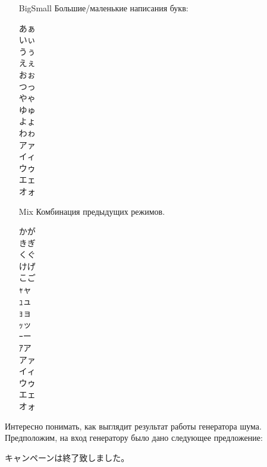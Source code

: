 \begin{itemize}
	\item[BigSmall] Большие/маленькие написания букв:
	
	\begin{multicols}{3}
	\begin{CJK}{UTF8}{min}
		あぁ \\
		いぃ\\
		うぅ\\
		えぇ\\
		おぉ\\
		つっ\\
		やゃ\\
		ゆゅ\\
		よょ\\
		わゎ\\
		アァ\\
		イィ\\
		ウゥ\\
		エェ\\
		オォ \end{CJK}
\end{multicols}

	\item[Mix] Комбинация предыдущих режимов.
		\begin{multicols}{3}
		\begin{CJK}{UTF8}{min}
			かが \\
			きぎ \\
			くぐ \\
			けげ \\
			こご \\
			ｬャ\\
			ｭュ\\
			ｮョ\\
			ｯッ\\
			ｰー\\
			ｱア\\
			アァ\\
			イィ\\
			ウゥ\\
			エェ\\
			オォ \end{CJK}
	\end{multicols}
	
\end{itemize}


Интересно понимать, как выглядит результат работы генератора шума.
Предположим, на вход генератору было дано следующее предложение:

\begin{CJK}{UTF8}{min}キャンペーンは終了致しました。 \end{CJK} 

